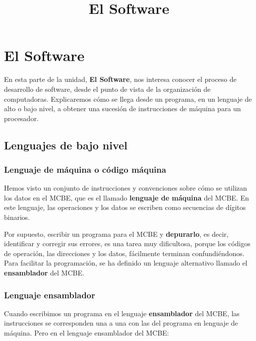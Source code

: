 \documentclass[spanish,a4paper,]{article}
\title{El Software}
\date{}
\begin{document}
\maketitle

\hypertarget{el-software}{%
\section{El Software}\label{el-software}}

En esta parte de la unidad, \textbf{El Software}, nos interesa conocer
el proceso de desarrollo de software, desde el punto de vista de la
organización de computadoras. Explicaremos cómo se llega desde un
programa, en un lenguaje de alto o bajo nivel, a obtener una sucesión de
instrucciones de máquina para un procesador.

\hypertarget{lenguajes-de-bajo-nivel}{%
\subsection{Lenguajes de bajo nivel}\label{lenguajes-de-bajo-nivel}}

\hypertarget{lenguaje-de-muxe1quina-o-cuxf3digo-muxe1quina}{%
\subsubsection{Lenguaje de máquina o código
máquina}\label{lenguaje-de-muxe1quina-o-cuxf3digo-muxe1quina}}

Hemos visto un conjunto de instrucciones y convenciones sobre cómo se
utilizan los datos en el MCBE, que es el llamado \textbf{lenguaje de
máquina} del MCBE. En este lenguaje, las operaciones y los datos se
escriben como secuencias de dígitos binarios.

Por supuesto, escribir un programa para el MCBE y \textbf{depurarlo}, es
decir, identificar y corregir sus errores, es una tarea muy dificultosa,
porque los códigos de operación, las direcciones y los datos, fácilmente
terminan confundiéndonos. Para facilitar la programación, se ha definido
un lenguaje alternativo llamado el \textbf{ensamblador} del MCBE.

\hypertarget{lenguaje-ensamblador}{%
\subsubsection{Lenguaje ensamblador}\label{lenguaje-ensamblador}}

Cuando escribimos un programa en el lenguaje \textbf{ensamblador} del
MCBE, las instrucciones se corresponden una a una con las del programa
en lenguaje de máquina. Pero en el lenguaje ensamblador del MCBE:
\end{document}
